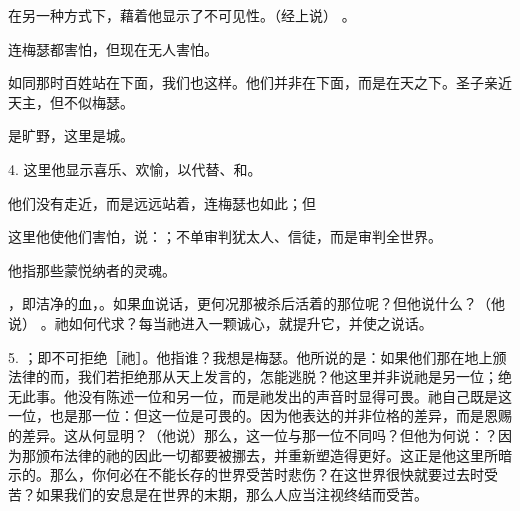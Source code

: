 在另一种方式下，藉着他显示了不可见性。（经上说） 。\par

连梅瑟都害怕，但现在无人害怕。\par

如同那时百姓站在下面，我们也这样。他们并非在下面，而是在天之下。圣子亲近天主，但不似梅瑟。\par

是旷野，这里是城。\par

4. 这里他显示喜乐、欢愉，以代替、和。\par

他们没有走近，而是远远站着，连梅瑟也如此；但\par

这里他使他们害怕，说：；不单审判犹太人、信徒，而是审判全世界。\par

他指那些蒙悦纳者的灵魂。\par

，即洁净的血，。如果血说话，更何况那被杀后活着的那位呢？但他说什么？（他说） 。祂如何代求？每当祂进入一颗诚心，就提升它，并使之说话。\par

5. ；即不可拒绝［祂］。他指谁？我想是梅瑟。他所说的是：如果他们那在地上颁法律的而，我们若拒绝那从天上发言的，怎能逃脱？他这里并非说祂是另一位；绝无此事。他没有陈述一位和另一位，而是祂发出的声音时显得可畏。祂自己既是这一位，也是那一位：但这一位是可畏的。因为他表达的并非位格的差异，而是恩赐的差异。这从何显明？（他说）那么，这一位与那一位不同吗？但他为何说：？因为那颁布法律的祂的因此一切都要被挪去，并重新塑造得更好。这正是他这里所暗示的。那么，你何必在不能长存的世界受苦时悲伤？在这世界很快就要过去时受苦？如果我们的安息是在世界的末期，那么人应当注视终结而受苦。\par

